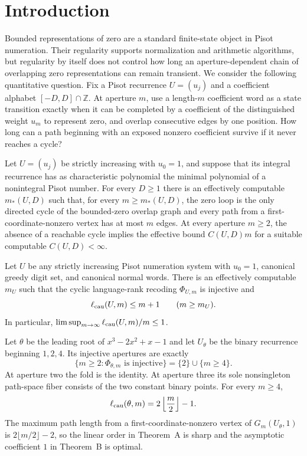 \section{Introduction}
\label{sec:introduction}

Bounded representations of zero are a standard finite-state object in
Pisot numeration.  Their regularity supports normalization and arithmetic
algorithms, but regularity by itself does not control how long an
aperture-dependent chain of overlapping zero representations can remain
transient.  We consider the following quantitative question.  Fix a Pisot
recurrence $U=(u_j)$ and a coefficient alphabet $[-D,D]\cap\mathbb Z$.  At
aperture $m$, use a length-$m$ coefficient word as a state transition exactly
when it can be completed by a coefficient of the distinguished weight $u_m$
to represent zero, and overlap consecutive edges by one position.  How long
can a path beginning with an exposed nonzero coefficient survive if it never
reaches a cycle?

\begin{theoremA}
Let $U=(u_j)$ be strictly increasing with $u_0=1$, and suppose that its
integral recurrence has as characteristic polynomial the minimal polynomial
of a nonintegral Pisot number.  For every $D\ge1$ there is an effectively
computable $m_*(U,D)$ such that, for every $m\ge m_*(U,D)$, the zero loop is
the only directed cycle of the bounded-zero overlap graph and every path
from a first-coordinate-nonzero vertex has at most $m$ edges.  At every
aperture $m\ge2$, the absence of a reachable cycle implies the effective
bound $C(U,D)m$ for a suitable computable $C(U,D)<\infty$.
\end{theoremA}

\begin{theoremB}
Let $U$ be any strictly increasing Pisot numeration system with $u_0=1$,
canonical greedy digit set, and canonical normal words.  There is an
effectively computable $m_U$ such that the cyclic language-rank recoding
$\Phi_{U,m}$ is injective and
\[
\ell_{\rm cau}(U,m)\le m+1
\qquad(m\ge m_U).
\]
In particular,
$\limsup_{m\to\infty}\ell_{\rm cau}(U,m)/m\le1$.
\end{theoremB}

\begin{theoremC}
Let $\theta$ be the leading root of $x^3-2x^2+x-1$ and let $U_\theta$ be the
binary recurrence beginning $1,2,4$.  Its injective apertures are exactly
\[
\{m\ge2:\Phi_{\theta,m}\text{ is injective}\}
=\{2\}\cup\{m\ge4\}.
\]
At aperture two the fold is the identity.  At aperture three its sole
nonsingleton path-space fiber consists of the two constant binary points.
For every $m\ge4$,
\[
\ell_{\rm cau}(\theta,m)=2\left\lfloor\frac m2\right\rfloor-1.
\]
The maximum path length from a first-coordinate-nonzero vertex of
$G_m(U_\theta,1)$ is $2\lfloor m/2\rfloor-2$, so the linear order in
Theorem~A is sharp and the asymptotic coefficient $1$ in Theorem~B is
optimal.
\end{theoremC}

